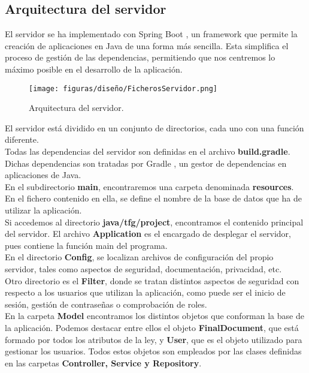 \subsection{Arquitectura  del servidor}

El servidor se ha implementado con Spring Boot \cite{spring}, un framework que permite la creación de aplicaciones en Java de una forma más sencilla. Esta simplifica el proceso de gestión de las dependencias, permitiendo que nos centremos lo máximo posible en el desarrollo de la aplicación.

\begin{figure}[H]
\centerline{\texttt{[image: figuras/diseño/FicherosServidor.png]}}
\caption{Arquitectura del servidor.}
\label{enlaceArquitecturaServidor}
\end{figure}

El servidor está dividido en un conjunto de directorios, cada uno con una función diferente. 
\\

Todas las dependencias del servidor son definidas en el archivo {\bf build.gradle}. Dichas dependencias son tratadas por Gradle \cite{gradle}, un gestor de dependencias en aplicaciones de Java.
\\

En el subdirectorio {\bf main}, encontraremos una carpeta denominada {\bf resources}. En el fichero contenido en ella, se define el nombre de la base de datos que ha de utilizar la aplicación.
\\

Si accedemos al directorio {\bf java/tfg/project}, encontramos el contenido principal del servidor. El archivo {\bf Application} es el encargado de desplegar el servidor, pues contiene la función main del programa.
\\

En el directorio {\bf Config}, se localizan archivos de configuración del propio servidor, tales como aspectos de seguridad, documentación, privacidad, etc. 
\\

Otro directorio es el {\bf Filter}, donde se tratan distintos aspectos de seguridad con respecto a los usuarios que utilizan la aplicación, como puede ser el inicio de sesión, gestión de contraseñas o comprobación de roles.
\\

En la carpeta {\bf Model} encontramos los distintos objetos que conforman la base de la aplicación. Podemos destacar entre ellos el objeto {\bf FinalDocument}, que está formado por todos los atributos de la ley, y {\bf User}, que es el objeto utilizado para gestionar los usuarios. Todos estos objetos son empleados por las clases definidas en las carpetas {\bf Controller, Service y Repository}.
\\

